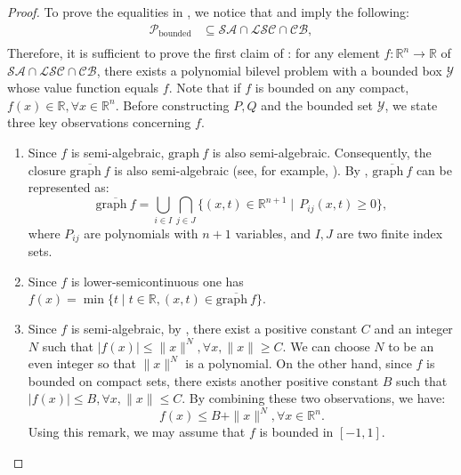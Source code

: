 \documentclass{article}
\newcommand*{\cP}{\mathcal{P}}
\newcommand*{\cY}{\mathcal{Y}}
\newcommand*{\RR}{\mathbb{R}}
\newcommand{\graph}{\mathrm{graph}\ }
\newcommand{\firstvar}{x}
\newcommand{\SA}{\mathcal{SA}}
\newcommand{\LSC}{\mathcal{LSC}}
\newcommand{\BC}{\mathcal{CB}}
\newcommand{\bounded}{\text{bounded}}
\theoremstyle{plain}
\theoremstyle{definition}
\begin{document}
\begin{proof}
    To prove the equalities in , we notice that  and  imply the following:
    \begin{equation*}
        \begin{aligned}
            \cP_{\bounded} &\subseteq \SA \cap \LSC \cap \BC,\\
        \end{aligned}
    \end{equation*}
    Therefore, it is sufficient to prove the first claim of : for any element $f: \RR^n \to \RR$ of $\SA \cap \LSC \cap \BC$, there exists a polynomial bilevel problem with a bounded box $\cY$ whose value function equals $f$. Note that if $f$ is bounded on any compact, $f(\firstvar) \in \RR, \forall \firstvar \in \RR^n$. Before constructing $P, Q$ and the bounded set $\cY$, we state three key observations concerning $f$.
    \begin{enumerate}[leftmargin=*]
        \item Since $f$ is semi-algebraic, $\graph f$ is also semi-algebraic. Consequently, the closure $\overline{\graph f}$ is also semi-algebraic (see, for example, \cite[Proposition 3.1]{realgeoalg}). By , $\overline{\graph f}$ can be represented as:
        \begin{equation}
            \label{eq:proof-closed-semi-algebraic-set}
            \overline{\graph f} = \bigcup_{i \in I}\bigcap_{j \in J} \{(x, t) \in \RR^{n+1} \mid \, P_{ij}(x,t) \geq 0\},
        \end{equation}
        where $P_{ij}$ are polynomials with $n+1$ variables, and $I,J$ are two finite index sets. 
        \item Since $f$ is lower-semicontinuous one has  $f(x) = \min \{t \mid t \in \RR, (x,t) \in \overline{\graph f}\}$.
        \item Since $f$ is semi-algebraic, by , there exist a positive constant $C$ and an integer $N$ such that $|f(x)| \leq \|x\|^N, \forall x, \|x\|\geq C$. We can choose $N$ to be an even integer so that $\|x\|^N$ is a polynomial. On the other hand, since $f$ is bounded on compact sets, there exists another positive constant $B$ such that $|f(x)| \leq B, \forall x, \|x\| \leq C$. By combining these two observations, we have:
        \begin{equation*}
            f(x) \leq B + \|x\|^N, \forall x \in \RR^n.
        \end{equation*}
       Using this remark, we may assume that $f$ is bounded in $[-1,1]$. 
       

\end{enumerate}
\end{proof}
\end{document}
